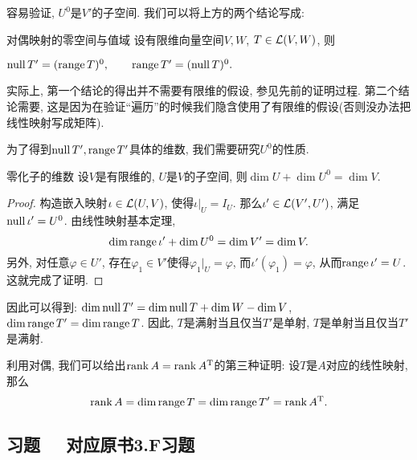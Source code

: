 容易验证, $U^0$是$V'$的子空间. 我们可以将上方的两个结论写成: 

\begin{proposition}{对偶映射的零空间与值域}
	设有限维向量空间$V,W$, $T \in \mathcal{L} (V,W)$, 则
	\begin{center}
		$\operatorname{null} T' = (\operatorname{range} T)^0,\qquad \operatorname{range} T' = (\operatorname{null} T)^0.$
	\end{center}
\end{proposition}
\begin{remark}
	实际上, 第一个结论的得出并不需要有限维的假设, 参见先前的证明过程. 第二个结论需要, 这是因为在验证“遍历”的时候我们隐含使用了有限维的假设(否则没办法把线性映射写成矩阵). 
\end{remark}

为了得到$\operatorname{null} T',\operatorname{range} T'$具体的维数, 我们需要研究$U^0$的性质. 

\begin{proposition}{零化子的维数}
	设$V$是有限维的, $U$是$V$的子空间, 则$\dim U + \dim U^0 = \dim V$. 
\end{proposition}
\begin{proof}
	构造嵌入映射$\iota \in \mathcal{L} (U,V)$, 使得$\iota |_U=I_U$. 那么$\iota ' \in \mathcal{L} (V',U')$, 满足$\operatorname{null} \iota ' = U^0$. 由线性映射基本定理, $$\dim \operatorname{range} \iota '+ \dim U^0 = \dim V' = \dim V. $$
	另外, 对任意$\varphi \in U'$, 存在$\varphi _1 \in V'$使得$\varphi _1|_U = \varphi$, 而$\iota ' (\varphi _1) = \varphi$, 从而$\operatorname{range} \iota ' = U$. 这就完成了证明. 
\end{proof}

因此可以得到: $\dim \operatorname{null} T' = \dim \operatorname{null} T + \dim W - \dim V$, $\dim \operatorname{range} T' = \dim \operatorname{range} T$. 因此, $T$是满射当且仅当$T'$是单射, $T$是单射当且仅当$T'$是满射. 

利用对偶, 我们可以给出$\operatorname{rank} A = \operatorname{rank} A^{\operatorname{T}}$的第三种证明: 设$T$是$A$对应的线性映射, 那么$$\operatorname{rank} A = \dim \operatorname{range} T = \dim \operatorname{range} T' = \operatorname{rank} A^{\operatorname{T}}. $$

\subsection*{习题  ~~\small 对应原书3.F习题}









